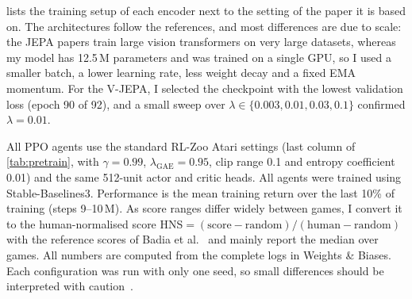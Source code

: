 \documentclass[runningheads]{llncs}
\begin{document}
 lists the training setup of each encoder next to the setting of the paper
it is based on. The architectures follow the references, and most differences are due to scale: the JEPA
papers train large vision transformers on very large datasets, whereas my model has
12.5\,M parameters and was trained on a single GPU, so I used a smaller batch, a lower learning
rate, less weight decay and a fixed EMA momentum. For the V-JEPA, I selected
the checkpoint with the lowest validation loss (epoch 90 of 92), and a small sweep over
$\lambda\in\{0.003,0.01,0.03,0.1\}$ confirmed $\lambda=0.01$.

All PPO agents use the standard RL-Zoo Atari settings (last column of \cref{tab:pretrain},
with $\gamma=0.99$, $\lambda_{\text{GAE}}=0.95$, clip range 0.1 and entropy coefficient 0.01)
and the same 512-unit actor and critic heads. All agents were trained using
Stable-Baselines3. Performance is the mean training return over the last 10\% of training (steps 9--10\,M). As
score ranges differ widely between games, I convert it to the human-normalised score
HNS$=(\text{score}-\text{random})/(\text{human}-\text{random})$ with the reference scores of
Badia et al.~\cite{badia2020agent57} and mainly report the median over games. All numbers are
computed from the complete logs in Weights \& Biases. Each configuration was run with only one
seed, so small differences should be interpreted with caution~\cite{agarwal2021precipice}.
\end{document}
